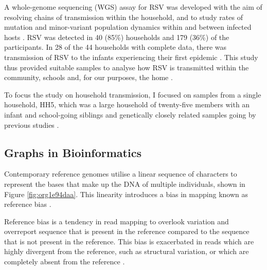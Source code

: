 \documentclass[10pt, a4paper]{article}
\begin{document}
A whole-genome sequencing (WGS) assay for RSV was developed with the aim of
resolving chains of transmission within the household, and to study rates of
mutation and minor-variant population dynamics within and between infected hosts
\cite{agotiGeneticDiversityRespiratory2014}.
RSV was detected in 40 (85\%) households and 179 (36\%) of the participants.
In 28 of the 44 households with complete data, there was transmission of RSV to
the infants experiencing their first epidemic
\cite{munywokiTransmissionRespiratorySyncytial2013}.
This study thus provided suitable samples to analyse how RSV is transmitted
within the community, schools and, for our purposes, the home
\cite{agotiTransmissionPatternsEvolution2017,agotiGenomicAnalysisRespiratory2019,githinjiAssessingUtilityMinority2018,kinyanjuiVaccineInducedHerd2015,munywokiInfluenceAgeSeverity2015}. 

To focus the study on household transmission, I focused on samples from a single
household, HH5, which was a large household of twenty-five members with an
infant and school-going siblings and genetically closely related samples going
by previous studies
\cite{githinjiAssessingUtilityMinority2018,agotiGenomicAnalysisRespiratory2019}.


\newpage

\subsection{Graphs in Bioinformatics}
\label{sec:orgeb06441}
Contemporary reference genomes utilise a linear sequence of characters to
represent the bases that make up the DNA of multiple individuals, shown in
Figure \ref{fig:org1e94daa}.
This linearity introduces a bias in mapping known as reference bias
\cite{degnerEffectReadmappingBiases2009,diltheyImprovedGenomeInference2015}.

Reference bias is a tendency in read mapping to overlook variation and
overreport sequence that is present in the reference compared to the sequence
that is not present in the reference.
This bias is exacerbated in reads which are highly divergent from the reference,
such as structural variation, or which are completely absent from the reference
\cite{degnerEffectReadmappingBiases2009,schneebergerSimultaneousAlignmentShort2009,liBuildingSequenceMap2010,brandtMappingBiasOverestimates2015,patenGenomeGraphsEvolution2017,garrisonVariationGraphToolkit2018}.
\end{document}
